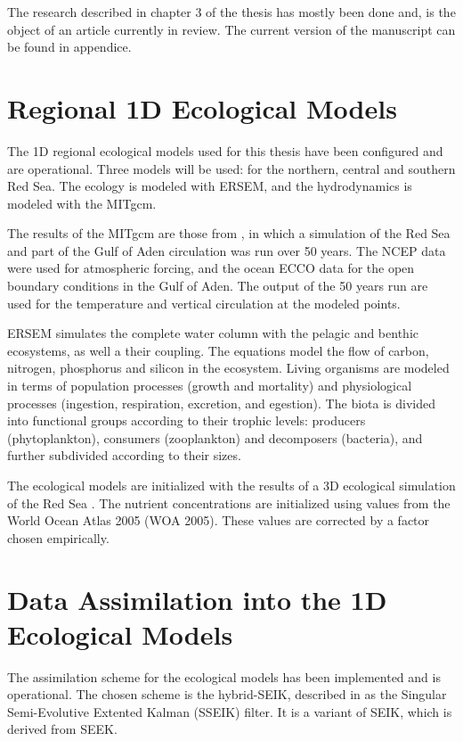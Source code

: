 The research described in chapter 3 of the thesis has mostly been done and, is
the object of an article currently in review. The current version of the
manuscript can be found in appendice.

\section{Regional 1D Ecological Models}

The 1D regional ecological models used for this thesis have been configured and
are operational. Three models will be used: for the northern, central and
southern Red Sea. The ecology is modeled with ERSEM, and the hydrodynamics is
modeled with the MITgcm.

The results of the MITgcm are those from \citet{Yao2014, Yao2014b}, in which a
simulation of the Red Sea and part of the Gulf of Aden circulation was run over
50 years. The NCEP data were used for atmospheric forcing, and the ocean ECCO data
for the open boundary conditions in the Gulf of Aden. The output of the 
50  years run are used for
the temperature and vertical circulation at the modeled points.

ERSEM simulates the complete water column with the pelagic and benthic
ecosystems, as well a their coupling. The equations model the flow of carbon,
nitrogen, phosphorus and silicon in the ecosystem. Living organisms are modeled
in terms of population processes (growth and mortality) and physiological
processes (ingestion, respiration, excretion, and egestion). The biota is
divided into functional groups according to their trophic levels: producers
(phytoplankton), consumers (zooplankton) and decomposers (bacteria), and
further subdivided according to their sizes.

The ecological models are initialized with the results of a 3D ecological
simulation of the Red Sea \citep{Triantafyllou2014}. The nutrient
concentrations are initialized using values from the World Ocean Atlas
2005 (WOA 2005). These values are corrected by a factor chosen empirically.

\section{Data Assimilation into the 1D Ecological Models}

The assimilation scheme for the ecological models has been implemented and is
operational. The chosen scheme is the hybrid-SEIK, described in
\citet{Hoteit2002} as the Singular Semi-Evolutive Extented Kalman (SSEIK)
filter. It is a variant of SEIK, which is derived from SEEK.

